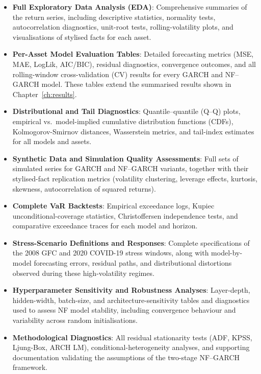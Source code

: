 \documentclass[oneside,12pt]{CUEDthesisPSnPDF}
\begin{document}
\begin{itemize}
    \item \textbf{Full Exploratory Data Analysis (EDA)}: 
    Comprehensive summaries of the return series, including descriptive statistics, normality tests, autocorrelation diagnostics, unit-root tests, rolling-volatility plots, and visualisations of stylised facts for each asset.

    \item \textbf{Per-Asset Model Evaluation Tables}: 
    Detailed forecasting metrics (MSE, MAE, LogLik, AIC/BIC), residual diagnostics, convergence outcomes, and all rolling-window cross-validation (CV) results for every GARCH and NF–GARCH model. These tables extend the summarised results shown in Chapter~\ref{ch:results}.

    \item \textbf{Distributional and Tail Diagnostics}: 
    Quantile–quantile (Q–Q) plots, empirical vs.\ model-implied cumulative distribution functions (CDFs), Kolmogorov-Smirnov distances, Wasserstein metrics, and tail-index estimates for all models and assets.

    \item \textbf{Synthetic Data and Simulation Quality Assessments}: 
    Full sets of simulated series for GARCH and NF–GARCH variants, together with their stylised-fact replication metrics (volatility clustering, leverage effects, kurtosis, skewness, autocorrelation of squared returns).

    \item \textbf{Complete VaR Backtests}:  
    Empirical exceedance logs, Kupiec unconditional-coverage statistics, Christoffersen independence tests, and comparative exceedance traces for each model and horizon.

    \item \textbf{Stress-Scenario Definitions and Responses}: 
    Complete specifications of the 2008 GFC and 2020 COVID-19 stress windows, along with model-by-model forecasting errors, residual paths, and distributional distortions observed during these high-volatility regimes.

    \item \textbf{Hyperparameter Sensitivity and Robustness Analyses}: 
    Layer-depth, hidden-width, batch-size, and architecture-sensitivity tables and diagnostics used to assess NF model stability, including convergence behaviour and variability across random initialisations.

    \item \textbf{Methodological Diagnostics}: 
    All residual stationarity tests (ADF, KPSS, Ljung-Box, ARCH LM), conditional-heterogeneity analyses, and supporting documentation validating the assumptions of the two-stage NF–GARCH framework.


\end{itemize}
\end{document}
